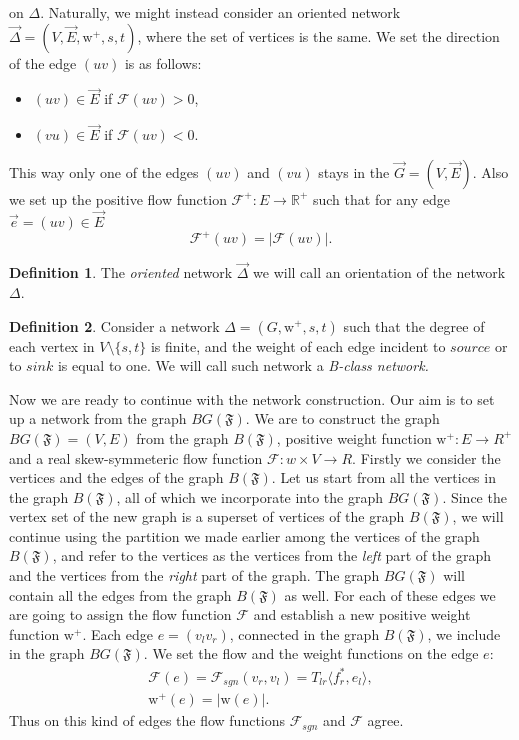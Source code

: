 \documentclass[12pt]{article}
\newcommand\inner[2]{\langle #1, #2 \rangle}
\theoremstyle{definition}
\newtheorem{definition}{Definition}
\newcommand{\fsys}{\mathfrak{F}}
\newcommand{\wt}{\mathrm{w}}
\newcommand{\wtpos}{\mathrm{w}^+}
\newcommand{\flow}{\mathcal{F}}
\newcommand{\flowpos}{\mathcal{F^+}}
\newcommand{\flowsgn}{\mathcal{F}_{sgn}}
\newcommand{\source}{\mathit{source}}
\newcommand{\sink}{\mathit{sink}}
\newcommand{\net}{\Delta}
\newcommand{\onet}{\vec{\Delta}}
\numberwithin{remark}{section}
\numberwithin{theorem}{section}
\numberwithin{prop}{section}
\numberwithin{equation}{section}
\numberwithin{lemma}{section}
\numberwithin{prop_under_lemma}{lemma}
\begin{document}
    on $\net$.
    Naturally, we might instead consider an oriented network $\onet = (V, \vec{E}, \wtpos, s, t)$, where
    the set of vertices is the same.
    We set the direction of the edge $(uv)$ is as follows:
    \begin{itemize}
      \item $(uv) \in \vec{E}$ if $\flow(uv) > 0$,
      \item $(vu) \in \vec{E}$ if $\flow(uv) < 0$.
    \end{itemize}
    This way only one of the edges $(uv)$ and $(vu)$ stays in the $\vec{G} = (V, \vec{E})$.
    Also we set up the positive flow function $\flowpos: E \to \mathbb{R}^+$ such that 
    for any edge $\vec{e} = (uv) \in \vec{E}$
    $$
      \flowpos(uv) = |\flow(uv)|.
    $$
    \begin{definition}
      The \emph{oriented} network $\onet$ we will call an orientation of the network $\net$.
    \end{definition}
    \begin{definition}
      Consider a network $\net = (G, \wtpos, s, t)$ such that
      the degree of each vertex in $V \setminus \{s, t\} $ is finite,
      and the weight of each edge incident to $\source$ or to $\sink$ is equal to one.
      We will call such network a \it{B-class network}.
    \end{definition}
    
    Now we are ready to continue with the network construction.
    Our aim is to set up a network from the graph $BG(\fsys)$.
    We are to construct the graph $BG(\fsys) = (V, E)$ from the graph $B(\fsys)$,
    positive weight function $\wtpos: E \to R^{+}$ and a real skew-symmeteric flow function $\flow: w \times V \to R$.
    Firstly we consider the vertices and the edges of the graph $B(\fsys)$.
    Let us start from all the vertices in the graph $B(\fsys)$, all of which we incorporate into the graph $BG(\fsys)$.
    Since the vertex set of the new graph is a superset of vertices of the graph $B(\fsys)$,
    we will continue using the partition we made earlier among the vertices of the graph $B(\fsys)$, and
    refer to the vertices as the vertices from the \textit{left} part of the graph and the vertices from the 
    \textit{right} part of the graph.
    The graph $BG(\fsys)$ will contain all the edges from the graph $B(\fsys)$ as well.
    For each of these edges we are going to assign the flow function $\flow$ and
    establish a new positive weight function $\wtpos$.
    Each edge $e = (v_l v_r)$, connected in the graph $B(\fsys)$, we include in the graph $BG(\fsys)$.
    We set the flow and the weight functions on the edge $e$:
    \begin{align*}
      \flow(e) = \flowsgn(v_r, v_l) = T_{lr} \inner{f^*_r}{e_l},\\
      \wtpos(e) = \left| \wt(e) \right|.
    \end{align*}
    Thus on this kind of edges the flow functions $\flowsgn$ and $\flow$ agree.
    
\end{document}
